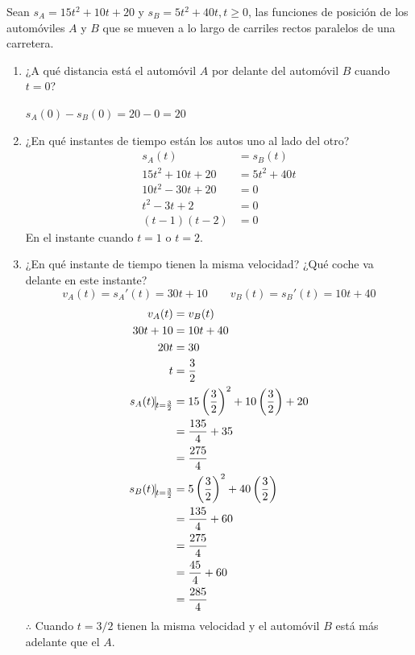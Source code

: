 \documentclass[12pt]{article}
\begin{document}
Sean $s_A = 15t^2 + 10t + 20$ y $s_B = 5t^2 + 40t, t \geq 0$, las funciones de posición de los automóviles $A$ y $B$ que se mueven a lo largo de carriles rectos paralelos de una carretera.

\begin{enumerate}[label=(\alph*)]
\item ¿A qué distancia está el automóvil $A$ por delante del automóvil $B$ cuando $t = 0$?

  $s_A(0)-s_B(0)=20-0=20$
  
\item ¿En qué instantes de tiempo están los autos uno al lado del otro?
  \begin{align*}
    s_A(t)
    &=s_B(t)\\
    15t^2 + 10t + 20
    &= 5t^2 + 40t \\
    10t^2 -30t + 20
    &=0\\
    t^2 -3t + 2
    &=0\\
    (t-1)(t-2)
    &=0
  \end{align*}
  En el instante cuando $t=1$ o $t=2$.
  
\item ¿En qué instante de tiempo tienen la misma velocidad? ¿Qué coche va delante en este instante?
  \[
  v_A(t)=s_A'(t)=30t+10 \qquad v_B(t)=s_B'(t)=10t+40
  \]
  \begin{align*}
    v_A(t)
    &=v_B(t)\\
    30t+10
    &=10t+40\\
    20t
    &=30\\
    t
    &= \frac{3}{2} \\
    s_A(t)\vline_{t=\frac{3}{2}}
    &=15\left(\frac{3}{2}\right)^2 + 10\left(\frac{3}{2}\right) + 20 \\
    &= \frac{135}{4}+35 \\
    &= \frac{275}{4}\\
    s_B(t)\vline_{t=\frac{3}{2}}
    &= 5\left(\frac{3}{2}\right)^2 + 40\left(\frac{3}{2}\right) \\
    &= \frac{135}{4}+60 \\
    &= \frac{275}{4}\\
    &= \frac{45}{4}+60 \\
    &= \frac{285}{4}
  \end{align*}
  $\therefore $ Cuando $t=3/2$ tienen la misma velocidad y el automóvil $B$ está más adelante que el $A$.
\end{enumerate}

\end{document}
